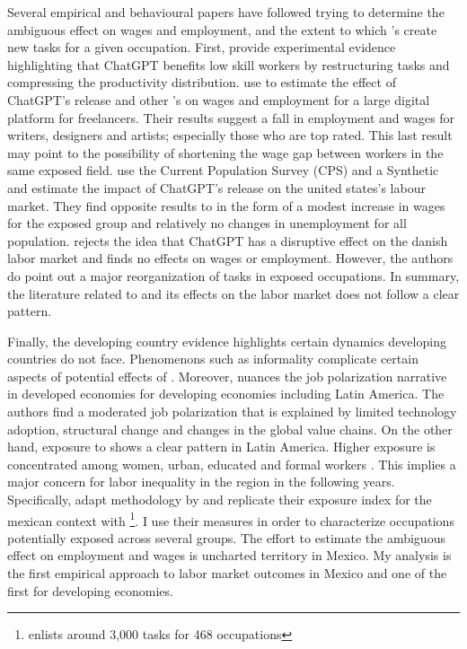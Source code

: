Several empirical and behavioural papers have followed \cite{eloundou2023gptsgptsearlylook} trying to determine the ambiguous effect on wages and employment, and the extent to which 's create new tasks for a given occupation. First, \cite{noy} provide experimental evidence highlighting that ChatGPT benefits low skill workers by restructuring tasks and compressing the productivity distribution. \cite{hui2024short} use  to estimate the effect of ChatGPT's release and other 's on wages and employment for a large digital platform for freelancers. Their results suggest a fall in employment and wages for writers, designers and artists; especially those who are top rated. This last result may point to the possibility of shortening the wage gap between workers in the same exposed field. \cite{Dang} use the Current Population Survey (CPS) and a Synthetic  and estimate the impact of ChatGPT's release on the united states's labour market. They find opposite results to \cite{hui2024short} in the form of a modest increase in wages for the exposed group and relatively no changes in unemployment for all population. \cite{humlum} rejects the idea that ChatGPT has a disruptive effect on the danish labor market and finds no effects on wages or employment. However, the authors do point out a major reorganization of tasks in exposed occupations. In summary, the literature related to  and its effects on the labor market does not follow a clear pattern.

Finally, the developing country evidence highlights certain dynamics developing countries do not face. Phenomenons such as informality complicate certain aspects of potential effects of . Moreover, \cite{neto} nuances the job polarization narrative in developed economies for developing economies including Latin America. The authors find a moderated job polarization that is explained by limited technology adoption, structural change and changes in the global value chains. On the other hand, exposure to  shows a clear pattern in Latin America.  Higher exposure is concentrated among women, urban, educated and formal workers \citep{azuara,worldbank,martinez2024risk}. This implies a major concern for labor inequality in the region in the following years. Specifically, \cite{martinez2024risk} adapt methodology by \cite{eloundou2023gptsgptsearlylook} and replicate their exposure index for the mexican context with \footnote{  enlists around 3,000 tasks for 468 occupations}. I use their measures in order to characterize occupations potentially exposed across several groups. The effort to estimate the ambiguous effect on employment and wages is uncharted territory in Mexico. My analysis is the first empirical approach to labor market outcomes in Mexico and one of the first for developing economies.




